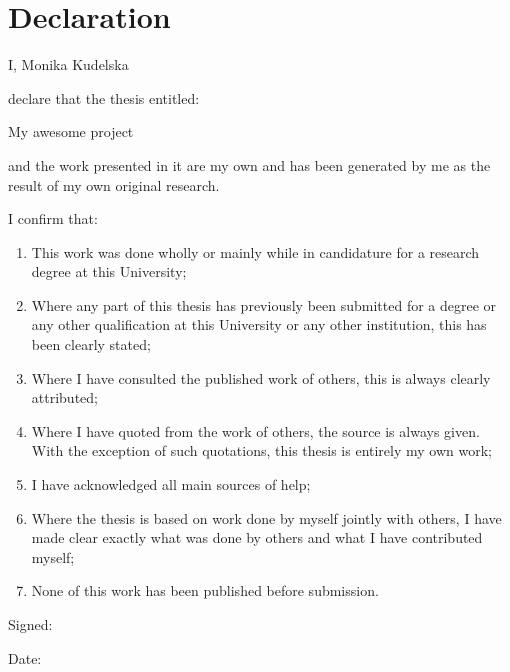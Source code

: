 \chapter*{Declaration}

I, Monika Kudelska

declare that the thesis entitled:

My awesome project %

and the work presented in it are my own and has been generated by me as the result of my own original research.

I confirm that:

\begin{enumerate}
\item This work was done wholly or mainly while in candidature for a research degree at this University;
\item Where any part of this thesis has previously been submitted for a degree or any other qualification at this University or any other institution, this has been clearly stated;
\item Where I have consulted the published work of others, this is always clearly attributed;
\item Where I have quoted from the work of others, the source is always given. With the exception of such quotations, this thesis is entirely my own work;
\item I have acknowledged all main sources of help;
\item Where the thesis is based on work done by myself jointly with others, I have made clear exactly what was done by others and what I have contributed myself;
\item None of this work has been published before submission.
\end{enumerate}

Signed:
 

Date:
